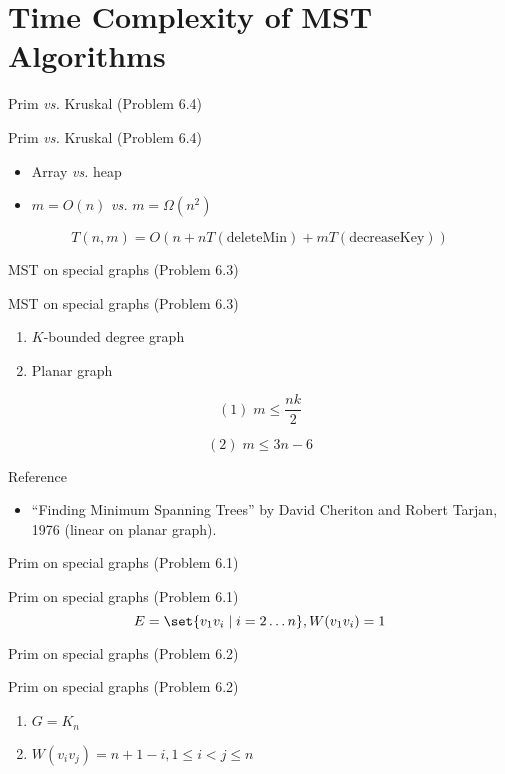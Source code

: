 \section{Time Complexity of MST Algorithms}

\begin{frame}{Prim \emph{vs.} Kruskal (Problem 6.4)}
  \begin{exampleblock}{Prim \emph{vs.} Kruskal (Problem 6.4)}
	\begin{itemize}
	  \item Array \emph{vs.} heap
	  \item $m = O(n)$ \emph{vs.} $m = \Omega(n^2)$
	\end{itemize}

	\[
	  T(n,m) = O(n + n T(\text{deleteMin}) + m T(\text{decreaseKey}))
	\]
  \end{exampleblock}
\end{frame}
\begin{frame}{MST on special graphs (Problem 6.3)}
  \begin{exampleblock}{MST on special graphs (Problem 6.3)}
	\begin{enumerate}
	  \item $K$-bounded degree graph
	  \item Planar graph
	\end{enumerate}
  \end{exampleblock}

  \[
	(1)\; m \le \frac{nk}{2}
  \]

  \[
	(2)\; m \le 3n - 6
  \]

  \begin{alertblock}{Reference}
	\begin{itemize}
	  \item ``Finding Minimum Spanning Trees'' by David Cheriton and Robert Tarjan, 1976 (linear on planar graph).
	\end{itemize}
  \end{alertblock}
\end{frame}
\begin{frame}{Prim on special graphs (Problem 6.1)}
  \begin{exampleblock}{Prim on special graphs (Problem 6.1)}
	\[
	  E = \set{v_1v_i \mid i = 2 \dots n}, W(v_1v_i) = 1
	\]
  \end{exampleblock}
\end{frame}
\begin{frame}{Prim on special graphs (Problem 6.2)}
  \begin{exampleblock}{Prim on special graphs (Problem 6.2)}
	\begin{enumerate}
	  \item $G = K_n$
	  \item $W(v_iv_j) = n + 1 -i, 1 \le i < j \le n$
	\end{enumerate}
  \end{exampleblock}
\end{frame}
